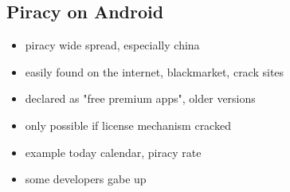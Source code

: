 \subsection{Piracy on Android} \label{subsection:foundation-piracy-android}
\begin{itemize}
    \item piracy wide spread, especially china
    \item easily found on the internet, blackmarket, crack sites
    \item declared as "free premium apps", older versions
    \item only possible if license mechanism cracked
    \item example today calendar, piracy rate
    \item some developers gabe up
\end{itemize}
